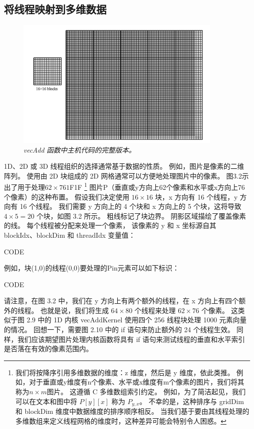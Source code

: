 \subsection{将线程映射到多维数据}
\begin{figure}[H]
	\centering
	\includegraphics[width=0.9\textwidth]{figs/F3.2.png}
	\caption{\textit{\color{red} vecAdd 函数中主机代码的完整版本。}}
\end{figure}

1D、2D 或 3D 线程组织的选择通常基于数据的性质。 例如，图片是像素的二维阵列。 
使用由 2D 块组成的 2D 网格通常可以方便地处理图片中的像素。 
图3.2示出了用于处理$62 \times 761$F1F
\footnote{我们将按降序引用多维数据的维度：z 维度，然后是 y 维度，依此类推。 
例如，对于垂直或y维度有n个像素、水平或x维度有m个像素的图片，我们将其称为$n \times m$图片。 
这遵循 C 多维数组索引约定。 例如，为了简洁起见，我们可以在文本和图中将 $P[y][x]$ 称为 $P_{y,x}$。 
不幸的是，这种排序与 gridDim 和 blockDim 维度中数据维度的排序顺序相反。 
当我们基于要由其线程处理的多维数组来定义线程网格的维度时，这种差异可能会特别令人困惑。}
图片P（垂直或y方向上62个像素和水平或x方向上76个像素）的这种布置。 
假设我们决定使用 $16 \times 16$ 块，x 方向有 16 个线程，y 方向有 16 个线程。 
我们需要 y 方向上的 4 个块和 x 方向上的 5 个块，这将导致 $4 \times 5 = 20$ 个块，如图 3.2 所示。 
粗线标记了块边界。 阴影区域描绘了覆盖像素的线。 每个线程被分配来处理一个像素，
该像素的 y 和 x 坐标源自其 blockIdx、blockDim 和 threadIdx 变量值：

{\color{red} CODE}

例如，块(1,0)的线程(0,0)要处理的Pin元素可以如下标识：

{\color{red} CODE}

请注意，在图 3.2 中，我们在 y 方向上有两个额外的线程，在 x 方向上有四个额外的线程。 
也就是说，我们将生成 $64 \times 80$ 个线程来处理 $62 \times 76$ 个像素。 
这类似于图 2.9 中的 1D 内核 vecAddKernel 使用四个 256 线程块处理 1000 元素向量的情况。 
回想一下，需要图 2.10 中的 if 语句来防止额外的 24 个线程生效。 
同样，我们应该期望图片处理内核函数将具有 if 语句来测试线程的垂直和水平索引是否落在有效的像素范围内。

